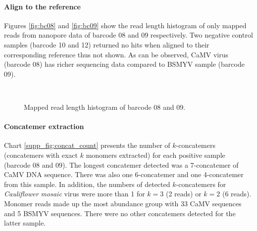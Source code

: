 \paragraph{Align to the reference}
Figures \ref{fig:bc08} and \ref{fig:bc09} show the read length histogram of only mapped reads from nanopore data of barcode 08 and 09 respectively. Two negative control samples (barcode 10 and 12) returned no hits when aligned to their corresponding reference thus not shown. As can be observed, CaMV virus (barcode 08) has richer sequencing data compared to BSMYV sample (barcode 09).
\begin{figure}[!ht]
\centering
{}
~
\caption{Mapped read length histogram of barcode 08 and 09.}
\label{fig:concat_map}
\end{figure}

\paragraph{Concatemer extraction}
Chart \ref{supp_fig:concat_count} presents the number of $k$-concatemers (concatemers with exact $k$ monomers extracted) for each positive sample (barcode 08 and 09). 
The longest concatemer detected was a 7-concatemer of CaMV DNA sequence. 
There was also one 6-concatemer and one 4-concatemer from this sample. 
In addition, the numbers of detected $k$-concatemers for \emph{Cauliflower mosaic} virus were more than 1 for $k=3$ (2 reads) or $k=2$ (6 reads).
Monomer reads made up the most abundance group with 33 CaMV sequences and 5 BSMYV sequences.
There were no other concatemers detected for the latter sample.

